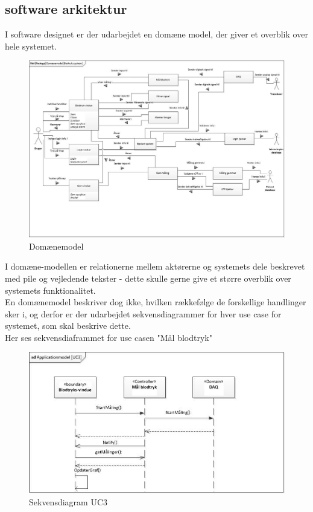    \subsection{software arkitektur}
   I software designet er der udarbejdet en domæne model, der giver et overblik over hele systemet.
 \begin{figure}[H]
	\centering
	\includegraphics[width=1\textwidth]{Figurer/ISE/Domaenemodel}
	\caption{Domænemodel}
	\label{domaenemodel}
\end{figure}
   I domæne-modellen er relationerne mellem aktørerne og systemets dele beskrevet med pile og vejledende tekster - dette skulle gerne give et større overblik over systemets funktionalitet. \\ 
   En domænemodel beskriver dog ikke, hvilken rækkefølge de forskellige handlinger sker i, og derfor er der udarbejdet sekvensdiagrammer for hver use case for systemet, som skal beskrive dette.\\
   Her ses sekvensdiaframmet for use casen "Mål blodtryk"
    \begin{figure}[H]
	\centering
	\includegraphics[width=1\textwidth]{Figurer/ISE/sdAppModelUC3}
	\caption{Sekvensdiagram UC3}
	\label{sekvensdiagram}
\end{figure}

